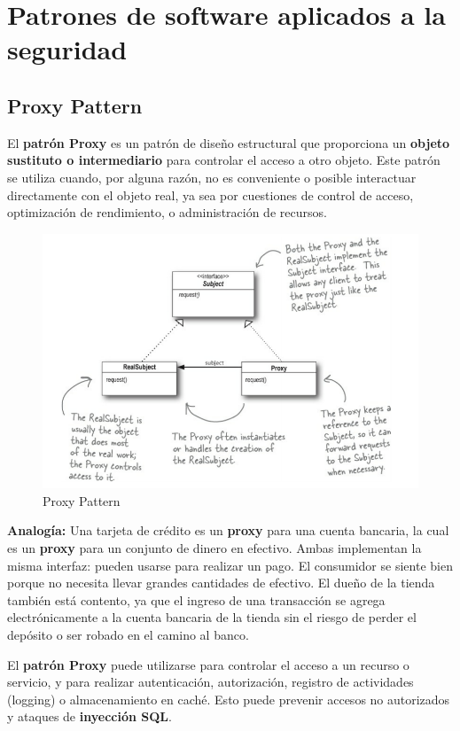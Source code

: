 

\chapter{Patrones de software aplicados a la seguridad}

\section{Proxy Pattern}

El \textbf{patrón Proxy} es un patrón de diseño estructural que proporciona un \textbf{objeto sustituto o intermediario} para controlar el acceso a otro objeto. Este patrón se utiliza cuando, por alguna razón, no es conveniente o posible interactuar directamente con el objeto real, ya sea por cuestiones de control de acceso, optimización de rendimiento, o administración de recursos.

\begin{figure}[H]
    \centering
        \includegraphics[width=0.5\linewidth]{PatronesSoftware/proxypattern.png}
        \caption{Proxy Pattern}
        \label{fig:proxy-pattern}
\end{figure}

\textbf{Analogía:} Una tarjeta de crédito es un \textbf{proxy} para una cuenta bancaria, la cual es un \textbf{proxy} para un conjunto de dinero en efectivo. Ambas implementan la misma interfaz: pueden usarse para realizar un pago. El consumidor se siente bien porque no necesita llevar grandes cantidades de efectivo. El dueño de la tienda también está contento, ya que el ingreso de una transacción se agrega electrónicamente a la cuenta bancaria de la tienda sin el riesgo de perder el depósito o ser robado en el camino al banco. 

El \textbf{patrón Proxy} puede utilizarse para controlar el acceso a un recurso o servicio, y para realizar autenticación, autorización, registro de actividades (logging) o almacenamiento en caché. Esto puede prevenir accesos no autorizados y ataques de \textbf{inyección SQL}.


